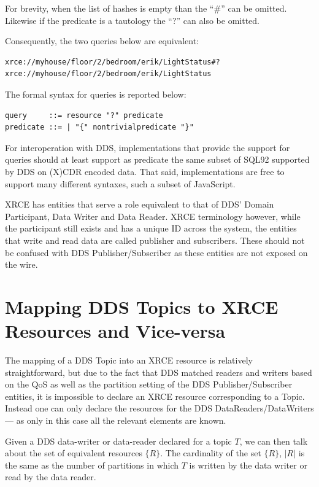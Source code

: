 \documentclass[a4paper,oneside,article]{memoir}
\begin{document}
For brevity, when the list of hashes is empty than the ``\#'' can be omitted. Likewise if the
predicate is a tautology the ``?'' can also be omitted.

Consequently, the two queries below are equivalent:
\begin{verbatim}
xrce://myhouse/floor/2/bedroom/erik/LightStatus#?
xrce://myhouse/floor/2/bedroom/erik/LightStatus
\end{verbatim}

The formal syntax for queries is reported below:
\begin{verbatim}
query     ::= resource "?" predicate
predicate ::= | "{" nontrivialpredicate "}"
\end{verbatim}

For interoperation with DDS, implementations that provide the support for queries should at least
support as predicate the same subset of SQL92 supported by DDS on (X)CDR encoded data.  That said,
implementations are free to support many different syntaxes, such a subset of JavaScript.

XRCE has entities that serve a role equivalent to that of DDS' Domain Participant, Data Writer and
Data Reader.  XRCE terminology however, while the participant still exists and has a unique ID
across the system, the entities that write and read data are called publisher and subscribers. These
should not be confused with DDS Publisher/Subscriber as these entities are not exposed on the wire.

\section{Mapping DDS Topics to XRCE Resources and Vice-versa}

The mapping of a DDS Topic into an XRCE resource is relatively straightforward, but due to the fact
that DDS matched readers and writers based on the QoS as well as the partition setting of the DDS
Publisher/Subscriber entities, it is impossible to declare an XRCE resource corresponding to a
Topic. Instead one can only declare the resources for the DDS DataReaders/DataWriters — as only in
this case all the relevant elements are known.

Given a DDS data-writer or data-reader declared for a topic $T$, we can then talk about the set of
equivalent resources $\{ R \}$. The cardinality of the set $\{ R \}$, $|R|$ is the same as the
number of partitions in which $T$ is written by the data writer or read by the data reader.
\end{document}
